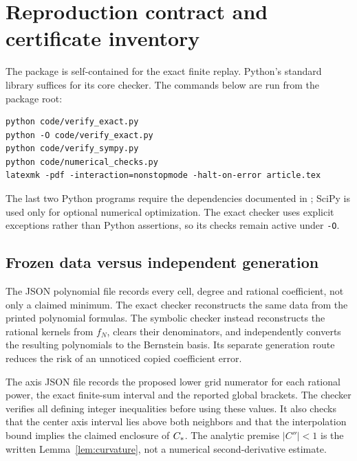 \section{Reproduction contract and certificate inventory}
\label{sec:reproduction}
The package is self-contained for the exact finite replay. Python's standard library suffices for its core checker. The commands below are run from the package root:
\noindent\begin{minipage}{\linewidth}
\begin{verbatim}
python code/verify_exact.py
python -O code/verify_exact.py
python code/verify_sympy.py
python code/numerical_checks.py
latexmk -pdf -interaction=nonstopmode -halt-on-error article.tex
\end{verbatim}
\end{minipage}

The last two Python programs require the dependencies documented in ; SciPy is used only for optional numerical optimization. The exact checker uses explicit exceptions rather than Python assertions, so its checks remain active under \texttt{-O}.

\subsection{Frozen data versus independent generation}
The JSON polynomial file records every cell, degree and rational coefficient, not only a claimed minimum. The exact checker reconstructs the same data from the printed polynomial formulas. The symbolic checker instead reconstructs the rational kernels from $f_N$, clears their denominators, and independently converts the resulting polynomials to the Bernstein basis. Its separate generation route reduces the risk of an unnoticed copied coefficient error.

The axis JSON file records the proposed lower grid numerator for each rational power, the exact finite-sum interval and the reported global brackets. The checker verifies all defining integer inequalities before using these values. It also checks that the center axis interval lies above both neighbors and that the interpolation bound implies the claimed enclosure of $C_*$. The analytic premise $|C''|<1$ is the written Lemma~\ref{lem:curvature}, not a numerical second-derivative estimate.

